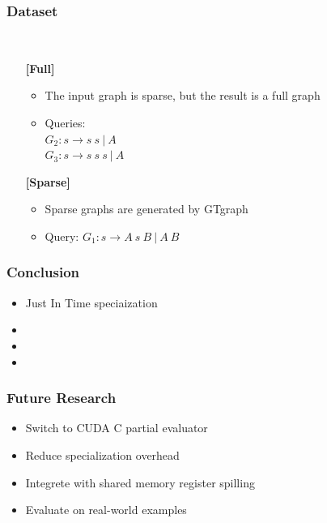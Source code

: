\documentclass[xcolor=table]{beamer}
\begin{document}
\begin{frame}[fragile] \frametitle{Dataset}
  \begin{minipage}[t]{1cm}
\hspace{1cm}
  \end{minipage}
  ~
\begin{minipage}[t]{0.85\textwidth}
\begin{itemize}
\item[\textbf{[Full]}]
\begin{itemize}
  \item The input graph is sparse, but the result is a full graph
  \item Queries: \\ $G_2: s \to s \ s \ | \ A$ \\ $G_3: s \to s \ s \ s \ | \ A$
\end{itemize}
\pause
\item[\textbf{[Sparse]}]
\begin{itemize}
  \item Sparse graphs are generated by GTgraph
  \item Query: $G_1: s \to A \ s \ B \ | \ A \ B$
\end{itemize}
\end{itemize}
\end{minipage}
\end{frame}

\begin{frame} \frametitle{Conclusion}
  \begin{itemize}
   \item Just In Time speciaization
   \item
   \item
   \item
  \end{itemize}
\end{frame}

\begin{frame}[fragile] \frametitle{Future Research}
  \begin{itemize}
    \item Switch to CUDA C partial evaluator
    \item Reduce specialization overhead
    \item Integrete with shared memory register spilling
    \item Evaluate on real-world examples
  \end{itemize}
\end{frame}
\end{document}
